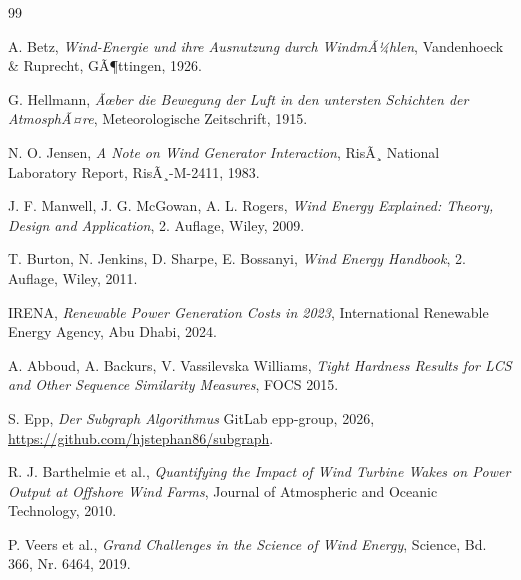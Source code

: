 ﻿\documentclass[a4paper,12pt]{article}
\theoremstyle{definition}
\begin{document}
\begin{thebibliography}{99}

A. Betz, \emph{Wind-Energie und ihre Ausnutzung durch WindmÃ¼hlen}, Vandenhoeck \& Ruprecht, GÃ¶ttingen, 1926.

G. Hellmann, \emph{Ãœber die Bewegung der Luft in den untersten Schichten der AtmosphÃ¤re}, Meteorologische Zeitschrift, 1915.

N. O. Jensen, \emph{A Note on Wind Generator Interaction}, RisÃ¸ National Laboratory Report, RisÃ¸-M-2411, 1983.

J. F. Manwell, J. G. McGowan, A. L. Rogers, \emph{Wind Energy Explained: Theory, Design and Application}, 2. Auflage, Wiley, 2009.

T. Burton, N. Jenkins, D. Sharpe, E. Bossanyi, \emph{Wind Energy Handbook}, 2. Auflage, Wiley, 2011.

IRENA, \emph{Renewable Power Generation Costs in 2023}, International Renewable Energy Agency, Abu Dhabi, 2024.

A. Abboud, A. Backurs, V. Vassilevska Williams, \emph{Tight Hardness Results for LCS and Other Sequence Similarity Measures}, FOCS 2015.

S. Epp, \emph{Der Subgraph Algorithmus} GitLab epp-group, 2026, \url{https://github.com/hjstephan86/subgraph}.

R. J. Barthelmie et al., \emph{Quantifying the Impact of Wind Turbine Wakes on Power Output at Offshore Wind Farms}, Journal of Atmospheric and Oceanic Technology, 2010.

P. Veers et al., \emph{Grand Challenges in the Science of Wind Energy}, Science, Bd. 366, Nr. 6464, 2019.

\end{thebibliography}
\end{document}
